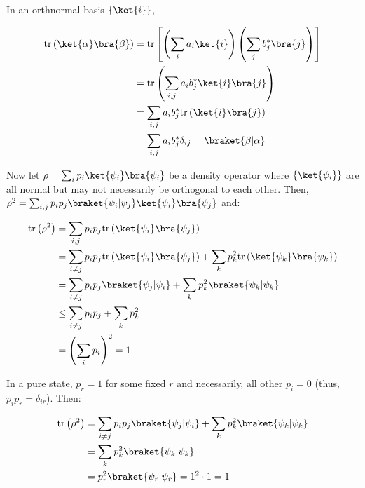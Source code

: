 \par In an orthnormal basis $\{\ket{i}\}$,

\begin{align}
\mathrm{tr} \left( \ket{\alpha} \bra{\beta} \right) &= \mathrm{tr} \left[ \left(
\sum_i{a_i \ket{i}} \right) \left( \sum_j{b_j^* \bra{j}} \right) \right] \\
&= \mathrm{tr} \left( \sum_{i, j}{a_i b_j^* \ket{i} \bra{j}} \right) \\
&= \sum_{i, j}{a_i b_j^* \mathrm{tr} \left( \ket{i} \bra{j} \right)} \\
&= \sum_{i, j}{a_i b_j^* \delta_{ij}} = \braket{\beta|\alpha}
\end{align}

\par Now let $\rho = \sum_i{p_i \ket{\psi_i} \bra{\psi_i}}$ be a density
operator where $\{\ket{\psi_i}\}$ are all normal but may not necessarily be
orthogonal to each other. Then, $\rho^2 = \sum_{i, j}{p_i p_j
\braket{\psi_i|\psi_j} \ket{\psi_i} \bra{\psi_j}}$ and:

\begin{align}
\mathrm{tr} \left( \rho^2 \right) &= \sum_{i, j}{p_i p_j \mathrm{tr} \left(
\ket{\psi_i} \bra{\psi_j} \right)} \\
&= \sum_{i \ne j}{p_i p_j \mathrm{tr} \left( \ket{\psi_i} \bra{\psi_j} \right)}
+ \sum_k{p_k^2 \mathrm{tr} \left( \ket{\psi_k} \bra{\psi_k} \right)} \\
&= \sum_{i \ne j}{p_i p_j \braket{\psi_j|\psi_i}} + \sum_k{p_k^2
\braket{\psi_k|\psi_k}} \\
&\le \sum_{i \ne j}{p_i p_j} + \sum_k{p_k^2} \\
&= \left( \sum_i{p_i} \right)^2 = 1
\end{align}

\par In a pure state, $p_r = 1$ for some fixed $r$ and necessarily, all other
$p_i = 0$ (thus, $p_i p_r = \delta_{ir}$). Then:

\begin{align}
\mathrm{tr} \left( \rho^2 \right) &= \sum_{i \ne j}{p_i p_j
\braket{\psi_j|\psi_i}} + \sum_k{p_k^2 \braket{\psi_k|\psi_k}} \\
&= \sum_k{p_k^2 \braket{\psi_k|\psi_k}} \\
&= p_r^2 \braket{\psi_r|\psi_r} = 1^2 \cdot 1 = 1
\end{align}
